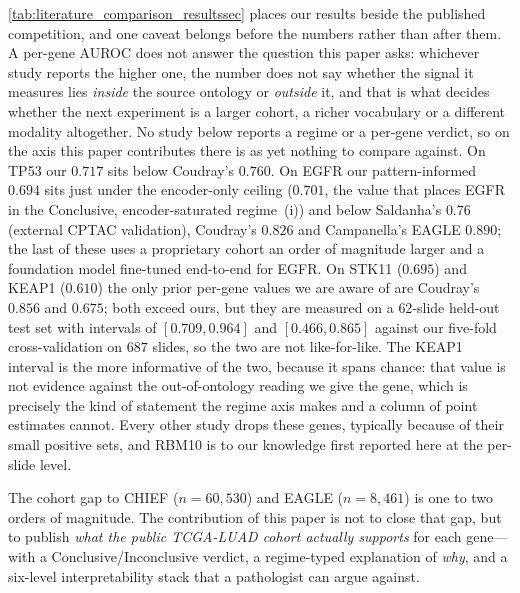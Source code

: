 \begin{table}[htbp]
\centering

\caption{Per-gene AUROC versus the published mutation-prediction
competition on LUAD.
This work reports six driver genes simultaneously on the public
TCGA-LUAD cohort under a single MIL aggregator;
prior work typically reports two to three driver genes on either
the same public cohort (Coudray, Saldanha, Zhao) or on proprietary
cohorts an order of magnitude larger (CHIEF, EAGLE).
Within \textbf{This work}, bold marks the better of the two aggregators
for each gene. No value is bolded \emph{across} studies: the protocols
are not comparable, mixing held-out test sets with cross-validation and
public with proprietary cohorts, so a column maximum would not identify
a better method.}
\label{tab:literature_comparison_resultssec}
\end{table}

\cref{tab:literature_comparison_resultssec} places our results
beside the published competition, and one caveat belongs before the
numbers rather than after them.
A per-gene AUROC does not answer the question this paper asks:
whichever study reports the higher one, the number does not say
whether the signal it measures lies \emph{inside} the source ontology
or \emph{outside} it, and that is what decides whether the next
experiment is a larger cohort, a richer vocabulary or a different
modality altogether.
No study below reports a regime or a per-gene verdict, so on the axis
this paper contributes there is as yet nothing to compare against.
On TP53 our $0.717$ sits below Coudray's $0.760$.
On EGFR our pattern-informed $0.694$ sits just under the
encoder-only ceiling ($0.701$, the value that places EGFR in the
Conclusive, encoder-saturated regime~(i)) and below Saldanha's $0.76$
(external CPTAC validation), Coudray's $0.826$ and Campanella's EAGLE
$0.890$; the last of these uses a proprietary cohort an order of magnitude
larger and a foundation model fine-tuned end-to-end for EGFR.
On STK11 ($0.695$) and KEAP1 ($0.610$) the only prior per-gene values
we are aware of are Coudray's $0.856$ and $0.675$; both exceed ours,
but they are measured on a $62$-slide held-out test set with intervals
of $[0.709,0.964]$ and $[0.466,0.865]$ against our five-fold
cross-validation on $687$ slides, so the two are not like-for-like.
The KEAP1 interval is the more informative of the two, because it
spans chance: that value is not evidence against the out-of-ontology
reading we give the gene, which is precisely the kind of statement the
regime axis makes and a column of point estimates cannot.
Every other study drops these genes, typically because of their small
positive sets, and RBM10 is to our knowledge first reported
here at the per-slide level.

The cohort gap to CHIEF ($n=60{,}530$) and EAGLE ($n=8{,}461$)
is one to two orders of magnitude.
The contribution of this paper is not to close that gap, but to
publish \emph{what the public TCGA-LUAD cohort actually
supports} for each gene---with a Conclusive/Inconclusive
verdict, a regime-typed explanation of \emph{why}, and a
six-level interpretability stack that a pathologist can argue
against.
